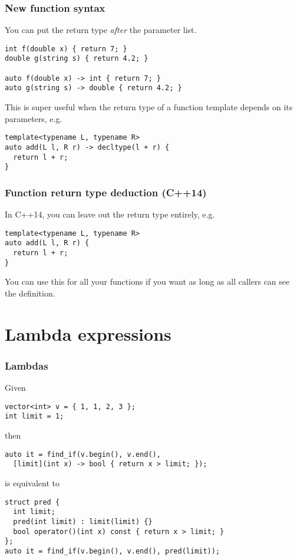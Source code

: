 \documentclass[aspectratio=1610]{beamer}
\begin{document}
\begin{frame}[fragile]
  \frametitle{New function syntax}
  You can put the return type \emph{after} the parameter list.
\begin{verbatim}
int f(double x) { return 7; }
double g(string s) { return 4.2; }

auto f(double x) -> int { return 7; }
auto g(string s) -> double { return 4.2; }
\end{verbatim}
  This is super useful when the return type of a function template depends on
  its parameters, e.g.
\begin{verbatim}
template<typename L, typename R>
auto add(L l, R r) -> decltype(l + r) {
  return l + r;
}
\end{verbatim}
\end{frame}

\begin{frame}[fragile]
  \frametitle{Function return type deduction (C++14)}
  In C++14, you can leave out the return type entirely, e.g.
\begin{verbatim}
template<typename L, typename R>
auto add(L l, R r) {
  return l + r;
}
\end{verbatim}
  You can use this for all your functions if you want as long as all callers can
  see the definition.
\end{frame}

\section{Lambda expressions}

\begin{frame}[fragile]
  \frametitle{Lambdas}
  Given
\begin{verbatim}
vector<int> v = { 1, 1, 2, 3 };
int limit = 1;
\end{verbatim}
  then
\begin{verbatim}
auto it = find_if(v.begin(), v.end(),
  [limit](int x) -> bool { return x > limit; });
\end{verbatim}
  is equivalent to
\begin{verbatim}
struct pred {
  int limit;
  pred(int limit) : limit(limit) {}
  bool operator()(int x) const { return x > limit; }
};
auto it = find_if(v.begin(), v.end(), pred(limit));
\end{verbatim}
\end{frame}
\end{document}
